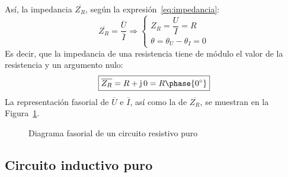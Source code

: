 Así, la impedancia $\overline{Z_R}$, según la
expresión~\eqref{eq:impedancia}:
\begin{equation*}
  \overline{Z_R}=\dfrac{\overline{U}}{\overline{I}}\Rightarrow
  \begin{cases}
    Z_R=\dfrac{U}{I}=R\\
    \theta=\theta_U-\theta_I=0
  \end{cases}
\end{equation*}
Es decir, que la impedancia de una resistencia tiene de módulo el
valor de la resistencia y un argumento nulo:
\begin{equation}\label{eq:resistencia}
  \boxed{ \overline{Z_R}=R+\mathrm{j}\,0=R\phase{0^\circ}}
\end{equation}
La representación fasorial de $\overline{U}$ e $\overline{I}$, así
como la de $\overline{Z_R}$, se muestran en la
Figura~\ref{fig:fasorResistencia}.
\begin{figure}[H]
  \centering {}\hfil
  \caption{Diagrama fasorial de un circuito resistivo puro}
  \label{fig:fasorResistencia}
\end{figure}
	
\subsection{Circuito inductivo puro}\label{sec:L-puro}
	
